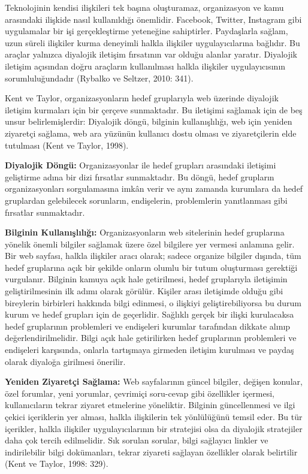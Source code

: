 \documentclass[
]{book}
\begin{document}
Teknolojinin kendisi ilişkileri tek başına oluşturamaz, organizasyon ve kamu arasındaki ilişkide nasıl kullanıldığı önemlidir. Facebook, Twitter, Instagram gibi uygulamalar bir işi gerçekleştirme yeteneğine sahiptirler. Paydaşlarla sağlam, uzun süreli ilişkiler kurma deneyimli halkla ilişkiler uygulayıcılarına bağlıdır. Bu araçlar yalnızca diyalojik iletişim fırsatının var olduğu alanlar yaratır. Diyalojik iletişim açısından doğru araçların kullanılması halkla ilişkiler uygulayıcısının sorumluluğundadır (Rybalko ve Seltzer, 2010: 341). \citep{rybalko2010dialogic}

Kent ve Taylor, organizasyonların hedef gruplarıyla web üzerinde diyalojik iletişim kurmaları için bir çerçeve sunmaktadır. Bu iletişimi sağlamak için de beş unsur belirlemişlerdir: Diyalojik döngü, bilginin kullanışlılığı, web için yeniden ziyaretçi sağlama, web ara yüzünün kullanıcı dostu olması ve ziyaretçilerin elde tutulması (Kent ve Taylor, 1998). \citep{kent1998building}

\textbf{Diyalojik Döngü:} Organizasyonlar ile hedef grupları arasındaki iletişimi geliştirme adına bir dizi fırsatlar sunmaktadır. Bu döngü, hedef grupların organizasyonları sorgulamasına imkân verir ve aynı zamanda kurumlara da hedef gruplardan gelebilecek sorunların, endişelerin, problemlerin yanıtlanması gibi fırsatlar sunmaktadır.

\textbf{Bilginin Kullanışlılığı:} Organizasyonların web sitelerinin hedef gruplarına yönelik önemli bilgiler sağlamak üzere özel bilgilere yer vermesi anlamına gelir. Bir web sayfası, halkla ilişkiler aracı olarak; sadece organize bilgiler dışında, tüm hedef gruplarına açık bir şekilde onların olumlu bir tutum oluşturması gerektiği vurgulanır. Bilginin kamuya açık hale getirilmesi, hedef gruplarıyla iletişimin geliştirilmesinin ilk adımı olarak görülür. Kişiler arası iletişimde olduğu gibi bireylerin birbirleri hakkında bilgi edinmesi, o ilişkiyi geliştirebiliyorsa bu durum kurum ve hedef grupları için de geçerlidir. Sağlıklı gerçek bir ilişki kurulacaksa hedef gruplarının problemleri ve endişeleri kurumlar tarafından dikkate alınıp değerlendirilmelidir. Bilgi açık hale getirilirken hedef gruplarının problemleri ve endişeleri karşısında, onlarla tartışmaya girmeden iletişim kurulması ve paydaş olarak diyaloğa girilmesi önerilir.

\textbf{Yeniden Ziyaretçi Sağlama:} Web sayfalarının güncel bilgiler, değişen konular, özel forumlar, yeni yorumlar, çevrimiçi soru-cevap gibi özellikler içermesi, kullanıcıların tekrar ziyaret etmelerine yöneliktir. Bilginin güncellenmesi ve ilgi çekici içeriklerin yer alması, halkla ilişkilerin tek yönlülüğünü temsil eder. Bu tür içerikler, halkla ilişkiler uygulayıcılarının bir stratejisi olsa da diyalojik stratejiler daha çok tercih edilmelidir. Sık sorulan sorular, bilgi sağlayıcı linkler ve indirilebilir bilgi dokümanları, tekrar ziyareti sağlayan özellikler olarak belirtilir (Kent ve Taylor, 1998: 329).
\end{document}
